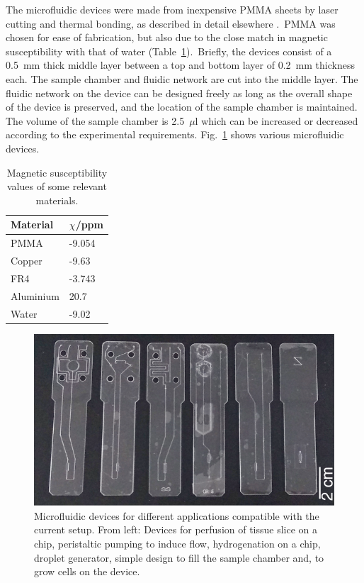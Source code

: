 \documentclass[preprint,5p]{elsarticle}
\newcommand{\fig}[1]{Fig.~\ref{#1}}
\begin{document}
The microfluidic devices were made from inexpensive PMMA sheets by laser cutting and
thermal bonding, as described in detail elsewhere \cite{yilmaz_bonding}.\cbstart\ PMMA was chosen for ease of fabrication, but also due to the close match in magnetic susceptibility with that of water (Table~\ref{tab:susceptibility}).\cbend\
Briefly, the devices consist of a 0.5~mm thick middle layer between a  top and
bottom layer of 0.2~mm thickness each. The sample chamber and fluidic network
are cut into the middle layer. The fluidic network on the device can be designed
freely as long as the overall shape of the device is preserved, and the location
of the sample chamber is maintained. The volume of the sample chamber is 2.5~$\mu$l which can be increased or decreased according to the experimental requirements. \cbstart \fig{fig:device} shows various microfluidic devices.\cbend
\cbstart
\begin{table}[h]
\centering
\caption{Magnetic susceptibility values of some relevant materials.\cite{wapler-2014,schenck-1996}}
\label{tab:susceptibility}
\begin{tabular}{||p{.3\linewidth}|p{.3\linewidth}||}
\hline
Material   & $\chi$/ppm	\\
\hline
PMMA		&-9.054	\\
Copper	&-9.63	\\
FR4	&-3.743		\\
Aluminium	&20.7	\\
Water & -9.02\\
\hline
\end{tabular}
\end{table}
\cbend
\cbstart
\begin{figure}
\centering
\includegraphics[width=\linewidth,keepaspectratio=true]{./figures/ms5n17-tlp-im-181007-devices.png}
\caption{Microfluidic devices for different applications compatible with the current setup.
From left: Devices for perfusion of tissue slice on a chip, peristaltic pumping to induce flow,
hydrogenation on a chip, droplet generator, simple design to fill the sample chamber and,
to grow cells on the device.}
\label{fig:device}
\end{figure}
\cbend
\end{document}
